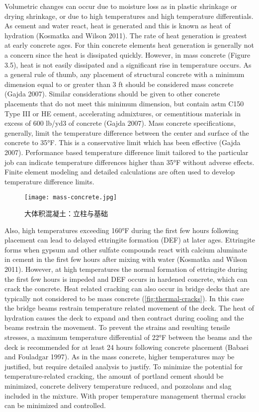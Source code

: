 Volumetric changes can occur due to moisture loss as in plastic shrinkage or drying shrinkage, or due to high
temperatures and high temperature differentials. As cement and water react, heat is generated and this is known as
heat of hydration (Kosmatka and Wilson 2011). The rate of heat generation is greatest at early concrete ages. For
thin concrete elements heat generation is generally not a concern since the heat is dissipated quickly. However, in
mass concrete (Figure 3.5), heat is not easily dissipated and a significant rise in temperature occurs. As a general rule
of thumb, any placement of structural concrete with a minimum dimension equal to or greater than 3 ft should be
considered mass concrete (Gajda 2007). Similar considerations should be given to other concrete placements that do
not meet this minimum dimension, but contain \acrshort*{astm} C150 Type III or HE cement, accelerating admixtures, or
cementitious materials in excess of 600 lb/yd3 of concrete (Gajda 2007). Mass concrete specifications, generally,
limit the temperature difference between the center and surface of the concrete to 35°F. This is a conservative limit which has been effective (Gajda 2007). Performance based temperature difference limit tailored to the particular job
can indicate temperature differences higher than 35°F without adverse effects. Finite element modeling and detailed
calculations are often used to develop temperature difference limits.

\begin{figure}
  \texttt{[image: mass-concrete.jpg]}
  \caption{大体积混凝土：立柱与基础}
  \label{fig:mass-concrete}
\end{figure}

Also, high temperatures exceeding 160°F during the first few hours following placement can lead to delayed ettringite formation (DEF) at later ages. Ettringite forms when gypsum and other sulfate compounds react with calcium aluminate in cement in the first few hours after mixing with water (Kosmatka and Wilson 2011). However, at high temperatures the normal formation of ettringite during the first few hours is impeded and DEF occurs in hardened concrete, which can crack the concrete. Heat related cracking can also occur in bridge decks that are typically not considered to be mass concrete (\cref{fig:thermal-cracks}). In this case the bridge beams restrain temperature related movement of the deck. The heat of hydration causes the deck to expand and then contract during cooling and the beams restrain the movement. To prevent the strains and resulting tensile stresses, a maximum temperature differential of 22°F between the beams and the deck is recommended for at least 24 hours following concrete placement (Babaei and Fouladgar 1997). As in the mass concrete, higher temperatures may be justified, but require detailed analysis to justify. To minimize the potential for temperature-related cracking, the amount of portland cement should be minimized, concrete delivery temperature reduced, and pozzolans and slag included in the mixture. With proper temperature management thermal cracks can be minimized and controlled.

